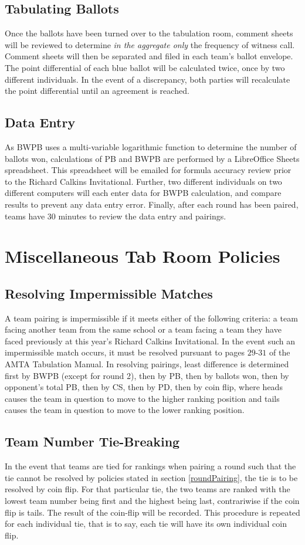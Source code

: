 \documentclass{article}
\begin{document}
\subsection{Tabulating Ballots}
Once the ballots have been turned over to the tabulation room, comment sheets will be reviewed to determine \textit{in the aggregate only} the frequency of witness call.  Comment sheets will then be separated and filed in each team's ballot envelope.  The point differential of each blue ballot will be calculated twice, once by two different individuals.  In the event of a discrepancy, both parties will recalculate the point differential until an agreement is reached.
\subsection{Data Entry}
As BWPB uses a multi-variable logarithmic function to determine the number of ballots won, calculations of PB and BWPB are performed by a LibreOffice Sheets spreadsheet.  This spreadsheet will be emailed for formula accuracy review prior to the Richard Calkins Invitational.  Further, two different individuals on two different computers will each enter data for BWPB calculation, and compare results to prevent any data entry error.  Finally, after each round has been paired, teams have 30 minutes to review the data entry and pairings.
\section{Miscellaneous Tab Room Policies}
\subsection{Resolving Impermissible Matches}
\label{impermissible}
A team pairing is impermissible if it meets either of the following criteria:  a team facing another team from the same school or a team facing a team they have faced previously at this year's Richard Calkins Invitational.  In the event such an impermissible match occurs, it must be resolved pursuant to pages $29$-$31$ of the AMTA Tabulation Manual.  In resolving pairings, least difference is determined first by BWPB (except for round 2), then by PB, then by ballots won, then by opponent's total PB, then by CS, then by PD, then by coin flip, where heads causes the team in question to move to the higher ranking position and tails causes the team in question to move to the lower ranking position.
\subsection{Team Number Tie-Breaking}
\label{tiebreaking}
In the event that teams are tied for rankings when pairing a round such that the tie cannot be resolved by policies stated in section \ref{roundPairing}, the tie is to be resolved by coin flip.  For that particular tie, the two teams are ranked with the lowest team number being first and the highest being last, contrariwise if the coin flip is tails. The result of the coin-flip will be recorded. This procedure is repeated for each individual tie, that is to say, each tie will have its own individual coin flip.
\end{document}
